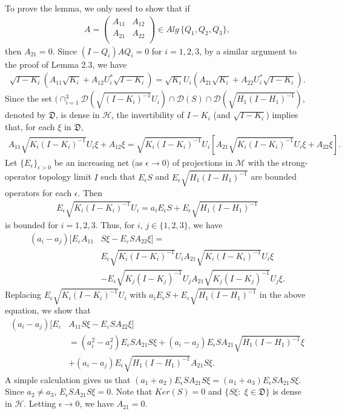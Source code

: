 \documentclass[12pt]{article}
\newcommand{\DDD}{\mathcal D}
\newcommand{\HHH}{\mathcal H} %
\newcommand{\MMM}{\mathcal M}
\begin{document}
{To prove the lemma, we only need to show that if
\begin{align*}
A =\left(
     \begin{array}{cc}
       A_{11} & A_{12} \\
       A_{21} & A_{22} \\
     \end{array}
   \right)\in
 Alg\,\{Q_{1}, Q_{2}, Q_{3}\},
\end{align*}
then $A_{21} = 0$. Since $(I-Q_{i})AQ_{i} = 0$ for $i=1,2,3$, by a
similar argument to the proof of  Lemma 2.3, we have
\begin{align*}
\sqrt{I-K_i}( A_{11}\sqrt{K_i} +A_{12}U_i^*\sqrt{I-K_i})=\sqrt{K_i}U_i(A_{21}\sqrt{K_i}+A_{22}U_i^*\sqrt{I-K_i}).
\end{align*}
Since the set $
(\cap_{i=1}^{3}\DDD(\sqrt{(I-K_i)^{-1}}U_i)\cap\DDD(S)\cap\DDD(\sqrt{H_{1}(I-H_{1})^{-1}})$,
denoted by $\mathfrak{D}$, is dense in $\HHH$, the invertibility of
$I-K_i$ (and $\sqrt{I-K_i}$) implies that, for each $\xi$ in
$\mathfrak{D}$,
\begin{align*}
A_{11}\sqrt{K_{i}(I-K_{i})^{-1}}U_{i}\xi + A_{12}\xi =
\sqrt{K_{i}(I-K_{i})^{-1}}U_{i}[A_{21}\sqrt{K_{i}(I-K_{i})^{-1}}U_{i}\xi
+ A_{22}\xi].
\end{align*}
Let $\{E_\epsilon \}_{\epsilon>0}$ be an increasing net (as
$\epsilon \rightarrow 0$) of projections in $\MMM$ with the
strong-operator topology limit $I$ such that $E_\epsilon S$ and
$E_\epsilon \sqrt{H_{1}(I-H_{1})^{-1}}$ are bounded operators for
each $\epsilon$. Then
\begin{align*}
E_\epsilon \sqrt{K_{i}(I-K_{i})^{-1}}U_i = a_{i}E_\epsilon S +
E_\epsilon \sqrt{H_{1}(I-H_{1})^{-1}}
\end{align*}
is bounded for $i=1,2,3$. Thus, for $i$, $j \in \{1, 2, 3\}$, we
have
\begin{align*}
(a_{i} -a_{j})[E_{\varepsilon}A_{11} &S\xi -
E_{\varepsilon}SA_{22}\xi]= \\
&E_\epsilon\sqrt{K_{i}(I  -K_{i})^{-1}}
U_{i}A_{21} \sqrt{K_{i}(I-K_{i})^{-1}}U_{i}\xi \\
&-E_{\epsilon}\sqrt{K_{j}(I-K_{j})^{-1}}
U_{j}A_{21}\sqrt{K_{j}(I-K_{j})^{-1}}U_{j}\xi.
\end{align*}
Replacing $E_\epsilon \sqrt{K_{i}(I-K_{i})^{-1}}U_i$ with
$a_{i}E_\epsilon S + E_\epsilon \sqrt{H_{1}(I-H_{1})^{-1}}$ in the
above equation, we show that
\begin{align*}
(a_{i} -a_{j})[E_{\varepsilon} &A_{11}S\xi -
E_{\varepsilon}SA_{22}\xi]\\
&= (a_i^2-a_j^2)E_{\epsilon}SA_{21}S\xi+(a_i-a_j)E_{\epsilon}SA_{21}\sqrt{H_{1}(I-H_{1})^{-1}}\xi\\
&+ (a_i-a_j)E_{\epsilon}\sqrt{H_{1}(I-H_{1})^{-1}}A_{21}S\xi.
\end{align*}
A simple calculation gives us that $(a_1+a_2)E_{\epsilon}SA_{21}S\xi
= (a_1+a_3)E_{\epsilon}SA_{21}S\xi$. Since $a_2\neq a_3$,
$E_{\epsilon}SA_{21}S\xi=0$. Note that $Ker(S) = 0$ and
$\{S\xi:\,\,\xi\in \mathfrak{D}\}$ is dense in $\HHH$. Letting
$\epsilon \rightarrow 0$, we have $A_{21} = 0$.

}
\end{document}
